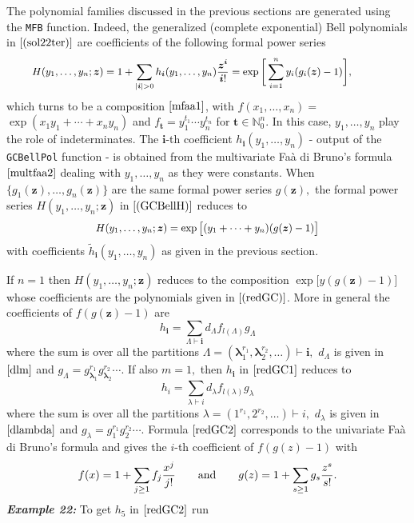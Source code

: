 The polynomial families discussed in the previous sections are generated using the \texttt{MFB} function. Indeed, the generalized (complete exponential) Bell polynomials in \(\eqref{(sol22ter)}\) are coefficients of the following formal power series
\begin{equation}
\hskip-1cm{\small H(y_1, \ldots, y_n; \boldsymbol{z}) = 1 + \sum_{|\boldsymbol{i}| > 0} h_{\boldsymbol{i}}(y_1, \ldots, y_n) \frac{{\boldsymbol{z}}^{\boldsymbol{i}}}{\boldsymbol{i}!} = \exp \bigg[ \sum_{i=1}^n y_i (g_i(\boldsymbol{z})-1) \bigg]},
\label{(GCBellH)}
\end{equation}
which turns to be a composition \(\eqref{mfaa1}\), with \(f(x_1, \ldots, x_n) =\) \(\exp(x_1 y_1 + \cdots + x_n y_n)\) and \(f_{\boldsymbol{t}} = y_1^{t_1} \cdots y_n^{t_n}\) for \(\boldsymbol{t} \in {\mathbb N}_0^n.\) In this case, \(y_1, \ldots, y_n\) play the role of indeterminates. The \(\boldsymbol{i}\)-th coefficient \(h_{\boldsymbol{i}}(y_1, \ldots, y_n)\) - output of the \texttt{GCBellPol} function - is obtained from the multivariate Faà di Bruno's formula \(\eqref{multfaa2}\) dealing with \(y_1, \ldots, y_n\) as they were constants. When \(\{g_1(\boldsymbol{z}), \ldots, g_n(\boldsymbol{z})\}\) are the same formal power series \(g(\boldsymbol{z}),\) the formal power series \(H(y_1, \ldots, y_n;\boldsymbol{z})\) in \(\eqref{(GCBellH)}\) reduces to
\begin{equation}
{\small H(y_1, \ldots, y_n; \boldsymbol{z}) = \exp \big[ (y_1 + \cdots + y_n) (g(\boldsymbol{z})-1) \big]}
\label{Hequal}
\end{equation}
with coefficients \(\tilde{h}_{\boldsymbol{i}}(y_1, \ldots, y_n)\) as given in the previous section.

If \(n=1\) then \(H(y_1, \ldots, y_n; \boldsymbol{z})\) reduces to the composition \(\exp \big[ y (g(\boldsymbol{z})-1)]\) whose coefficients are the polynomials given in \(\eqref{(redGC)}\). More in general the coefficients of \(f(g(\boldsymbol{z})-1)\) are
\begin{equation}
h_{\boldsymbol{i}} =  \sum_{{\Lambda} \vdash  \boldsymbol{i}} d_{\Lambda}  f_{l(\Lambda)} 
g_{\Lambda}
\label{redGC1}
\end{equation}
where the sum is over all the partitions \(\Lambda=(\boldsymbol{\lambda}_1^{r_1} , \boldsymbol{\lambda}_2^{r_2}, \ldots) \vdash \boldsymbol{i},\) \(d_{\Lambda}\) is given in \(\eqref{dlm}\) and
\(g_{\Lambda} = g_{\boldsymbol{\lambda}_1}^{r_1} g_{\boldsymbol{\lambda}_2}^{r_2} \cdots.\) If also \(m=1,\) then \(h_{\boldsymbol{i}}\) in \(\eqref{redGC1}\) reduces to
\begin{equation}
h_{i} =  \sum_{{\lambda} \vdash  i} d_{\lambda}  f_{l(\lambda)} 
g_{\lambda}
\label{redGC2}
\end{equation}
where the sum is over all the partitions \(\lambda=(1^{r_1} , 2^{r_2}, \ldots) \vdash i,\) \(d_{\lambda}\) is given in \(\eqref{dlambda}\) and
\(g_{\lambda} = g_1^{r_1} g_{2}^{r_2} \cdots.\) Formula \(\eqref{redGC2}\) corresponds to the univariate Faà di Bruno's formula and gives the \(i\)-th coefficient of
\(f(g(z)-1)\) with
\[f(x)=1+\sum_{j \geq 1} f_j \frac{x^j}{j!} \qquad \hbox{and} \qquad g(z)=1+\sum_{s \geq 1} g_s \frac{z^s}{s!}.\]
\textbf{\emph{Example 22:}} To get \(h_{5}\) in \(\eqref{redGC2}\) run

